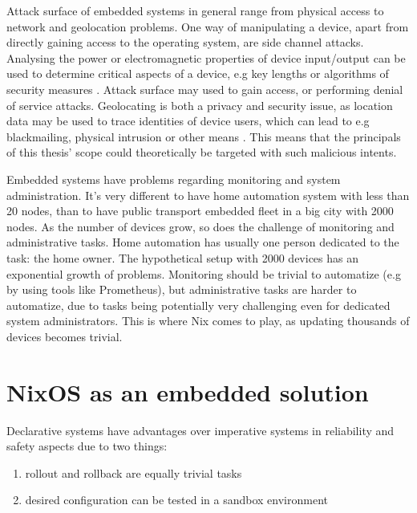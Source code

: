 Attack surface of embedded systems in general range from physical
access to network and geolocation problems. One way of manipulating a
device, apart from directly gaining access to the operating system,
are side channel attacks. Analysing the power or electromagnetic
properties of device input/output can be used to determine critical
aspects of a device, e.g key lengths or algorithms of security
measures \cite{fysarakis2014embedded, serpanos2013security}. Attack surface may used to gain access, or performing denial
of service attacks. Geolocating is both a privacy and security issue,
as location data may be used to trace identities of device users,
which can lead to e.g blackmailing, physical intrusion or other
means \cite{fysarakis2014embedded}. This means that the principals of
this thesis' scope could theoretically be targeted with such malicious intents. 

Embedded systems have problems regarding monitoring and system
administration. It's very different to have home automation system
with less than 20 nodes, than to have public transport embedded fleet
in a big city with 2000 nodes. As the number of devices grow, so does
the challenge of monitoring and administrative tasks. Home automation
has usually one person dedicated to the task: the home owner. The
hypothetical setup with 2000 devices has an exponential growth of
problems. Monitoring should be trivial to automatize (e.g by using
tools like Prometheus), but administrative tasks are harder to
automatize, due to tasks being potentially very challenging even for
dedicated system administrators. This is where Nix comes to play, as
updating thousands of devices becomes trivial.


\section{NixOS as an embedded solution} \label{nixosassolution}

Declarative systems have advantages over imperative systems in
reliability and safety aspects due to two things:

\begin{enumerate}

\item rollout and rollback are equally trivial tasks
\item desired configuration can be tested in a sandbox environment
  
\end{enumerate}

